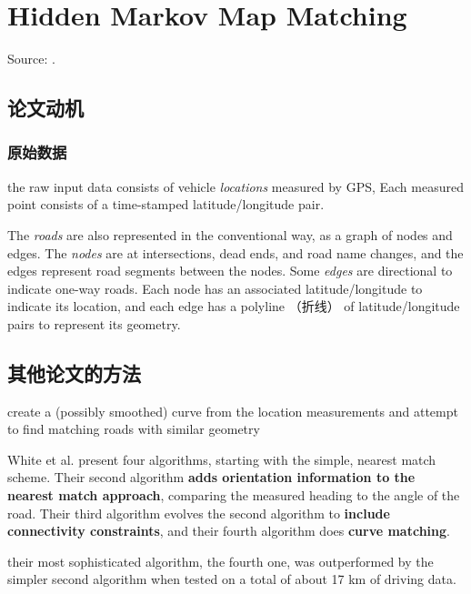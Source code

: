 \chapter{Hidden Markov Map Matching}

Source: \cite{newson2009hidden}.

\section{论文动机}

\subsection{原始数据}

the raw input
data consists of vehicle \textit{locations} measured by GPS, Each measured point consists of a time-stamped
latitude/longitude pair. 

The \textit{roads} are also represented in the
conventional way, as a graph of nodes and edges.
The \textit{nodes} are at
intersections, dead ends, and road name changes, and the edges
represent road segments between the nodes. Some \textit{edges} are
directional to indicate one-way roads. Each node has an associated
latitude/longitude to indicate its location, and each edge has a
polyline （折线） of latitude/longitude pairs to represent its geometry.

\section{其他论文的方法}

create a (possibly smoothed) curve
from the location measurements and attempt to find matching
roads with similar geometry

\begin{example}
White et al. 
present four algorithms, starting with the simple, nearest match
scheme. 
Their second algorithm \textbf{adds orientation information to
the nearest match approach}, comparing the measured heading to
the angle of the road. Their third algorithm evolves the second
algorithm to \textbf{include connectivity constraints}, and their fourth
algorithm does \textbf{curve matching}. 

\begin{remark}
    their most sophisticated algorithm, the fourth one, was
outperformed by the simpler second algorithm when tested on a
total of about 17 km of driving data.
\end{remark}
\end{example}

